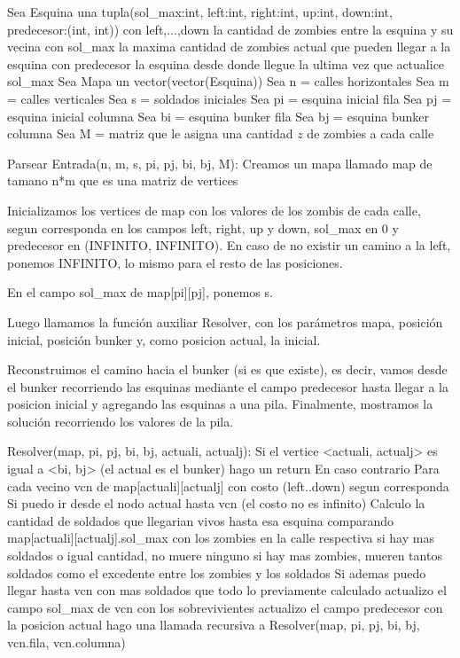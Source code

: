 \begin{codesnippet}
Sea Esquina una tupla(sol_max:int, left:int, right:int,
        up:int, down:int, predecesor:(int, int))
  con left,...,down la cantidad de zombies entre la esquina y su vecina
  con sol_max la maxima cantidad de zombies actual que pueden llegar a la esquina
  con predecesor la esquina desde donde llegue la ultima vez que actualice sol_max
Sea Mapa un vector(vector(Esquina))
Sea n = calles horizontales
Sea m = calles verticales
Sea s = soldados iniciales
Sea pi = esquina inicial fila
Sea pj = esquina inicial columna
Sea bi = esquina bunker fila
Sea bj = esquina bunker columna
Sea M = matriz que le asigna una cantidad $z$ de zombies a cada calle

Parsear Entrada(n, m, s, pi, pj, bi, bj, M):
  Creamos un mapa llamado map de tamano n*m que es una matriz de vertices

  Inicializamos los vertices de map con los valores de los zombis de cada calle,
  segun corresponda en los campos left, right, up y down,
  sol_max en 0 y predecesor en (INFINITO, INFINITO).
  En caso de no existir un camino a la left, ponemos INFINITO,
  lo mismo para el resto de las posiciones.

  En el campo sol_max de map[pi][pj], ponemos s.

  Luego llamamos la función auxiliar Resolver, con los parámetros mapa,
  posición inicial, posición bunker y, como posicion actual, la inicial.

  Reconstruimos el camino hacia el bunker (si es que existe), es decir, vamos
  desde el bunker recorriendo las esquinas mediante el campo predecesor hasta
  llegar a la posicion inicial y agregando las esquinas a una pila. Finalmente,
  mostramos la solución recorriendo los valores de la pila.

Resolver(map, pi, pj, bi, bj, actuali, actualj):
  Si el vertice <actuali, actualj> es igual a <bi, bj> (el actual es el bunker)
    hago un return
  En caso contrario
    Para cada vecino vcn de map[actuali][actualj] con
        costo (left..down) segun corresponda
    Si puedo ir desde el nodo actual hasta vcn (el costo no es infinito)
    Calculo la cantidad de soldados que llegarian vivos hasta esa esquina
      comparando map[actuali][actualj].sol_max con los zombies en la calle respectiva
      si hay mas soldados o igual cantidad, no muere ninguno
      si hay mas zombies, mueren tantos soldados como el excedente
          entre los zombies y los soldados
    Si ademas puedo llegar hasta vcn con mas soldados que todo lo previamente calculado
      actualizo el campo sol_max de vcn con los sobrevivientes
      actualizo el campo predecesor con la posicion actual
      hago una llamada recursiva a Resolver(map, pi, pj, bi, bj, vcn.fila, vcn.columna)

\end{codesnippet}

